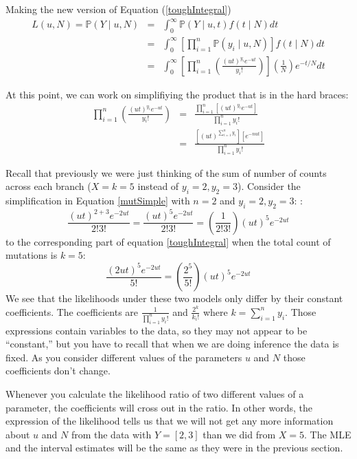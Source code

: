 \documentclass[11pt]{article}
\renewcommand{\Pr}{\mathbb{P}}
\begin{document}
Making the new version of Equation (\ref{toughIntegral})
\begin{eqnarray}
L(u, N)  = \Pr(Y \mid u, N)  & = &  \int_{0}^{\infty} \Pr(Y \mid u, t) f(t\mid N) dt \\
& = &  \int_{0}^{\infty} \left[ \prod_{i=1}^{n}  \Pr(y_i \mid u, N) \right]f(t\mid N)  dt\\
& = &  \int_{0}^{\infty} \left[ \prod_{i=1}^{n}\left(\frac{(ut)^{y_i} e^{-ut}}{y_i!} \right)\right] \left(\frac{1}{N}\right) e^{-t/N}dt 
\end{eqnarray}

At this point, we can work on simplifiying the product that is in the hard braces:
\begin{eqnarray}
 \prod_{i=1}^{n}\left(\frac{(ut)^{y_i} e^{-ut}}{y_i!} \right) & = & 
  \frac{\prod_{i=1}^{n}\left[(ut)^{y_i} e^{-ut}\right]}{\prod_{i=1}^{n}y_i!} \\
  & = & 
  \frac{\left[(ut)^{\sum_{i=1}^n y_i}\right] \left[e^{-nut}\right]}{\prod_{i=1}^{n}y_i!}
  \label{mutSimple}
\end{eqnarray}

Recall that previously we were just thinking of the sum of number of counts
across each branch ($X = k = 5$ instead of $y_i=2, y_2 = 3$).
Consider the simplification in Equation \ref{mutSimple} with $n=2$ and $y_i=2, y_2 = 3$:
:
$$ \frac{(ut)^{2+3}e^{-2ut}}{2!3!} = \frac{(ut)^{5}e^{-2ut}}{2!3!} = \left(\frac{1}{{2!3!}}\right)(ut)^{5}e^{-2ut}$$ 
to the corresponding part of equation \ref{toughIntegral} when the total count of mutations is $k=5$:
$$\frac{(2ut)^5 e^{-2ut}}{5!} = \left(\frac{2^5}{{5!}}\right)(ut)^{5}e^{-2ut}$$
We see that the likelihoods under these two models only differ by their constant
coefficients.
The coefficients are $\frac{1}{\prod_{i=1}^{n}y_i!}$ and $\frac{2^{k}}{k_i!}$ where $k=\sum_{i=1}^n y_i$.
Those expressions contain variables to the data, so they may not appear to be ``constant,''
but you have to recall that when we are doing inference the data is fixed.
As you consider different values of the parameters $u$ and $N$ those coefficients don't 
change.

Whenever you calculate the likelihood ratio of two different values of a parameter, the
coefficients will cross out in the ratio.
In other words, the expression of the likelihood tells us that we will not get 
any more information about $u$ and $N$ from the data with $Y=[2, 3]$ than we did
from $X=5$.
The MLE and the interval estimates will be the same as they were in the previous section.
\end{document}

